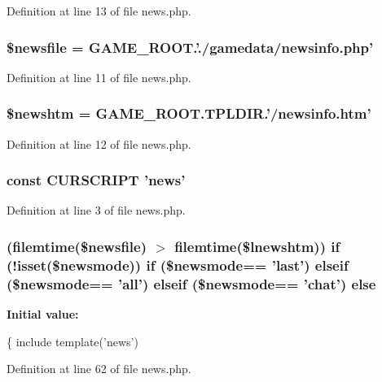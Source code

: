 Definition at line 13 of file news.\+php.

\hypertarget{news_8php_a3636c8bd5fc9a90bdbcea8dca02021f0}{
\subsubsection[{\$newsfile}]{\setlength{\rightskip}{0pt plus 5cm}\$newsfile = G\+A\+M\+E\+\_\+\+R\+O\+O\+T.'./gamedata/newsinfo.\+php'}}\label{news_8php_a3636c8bd5fc9a90bdbcea8dca02021f0}


Definition at line 11 of file news.\+php.

\hypertarget{news_8php_a1070e769e4c48f32dfd487e7f0c564c5}{
\subsubsection[{\$newshtm}]{\setlength{\rightskip}{0pt plus 5cm}\$newshtm = G\+A\+M\+E\+\_\+\+R\+O\+O\+T.\+T\+P\+L\+D\+I\+R.'/newsinfo.\+htm'}}\label{news_8php_a1070e769e4c48f32dfd487e7f0c564c5}


Definition at line 12 of file news.\+php.

\hypertarget{news_8php_a39c39f525eceb86cabc338804f230e80}{
\subsubsection[{C\+U\+R\+S\+C\+R\+I\+P\+T}]{\setlength{\rightskip}{0pt plus 5cm}const C\+U\+R\+S\+C\+R\+I\+P\+T 'news'}}\label{news_8php_a39c39f525eceb86cabc338804f230e80}


Definition at line 3 of file news.\+php.

\hypertarget{news_8php_a58f16d0fd6e3252121ff2eb2fa21b99d}{
\subsubsection[{else}]{ (filemtime(\$newsfile) $>$ filemtime(\$lnewshtm)) {\bf if} (!isset(\$newsmode)) {\bf if} (\$newsmode== 'last') {\bf elseif} (\$newsmode== 'all') {\bf elseif} (\$newsmode== '{\bf chat}') else}}\label{news_8php_a58f16d0fd6e3252121ff2eb2fa21b99d}
{\bfseries Initial value\+:}
\begin{DoxyCode}
\{
    include \textcolor{keyword}{template}(\textcolor{stringliteral}{'news'})
\end{DoxyCode}


Definition at line 62 of file news.\+php.

